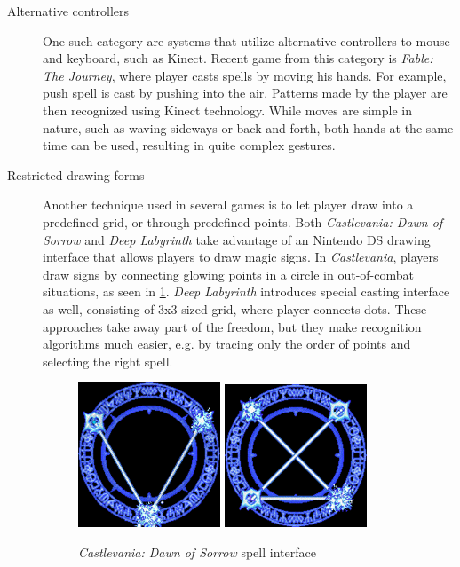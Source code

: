 \begin{description}
\item[Alternative controllers]
One such category are systems that utilize alternative controllers to mouse and keyboard, such as Kinect. Recent game from this category is \emph{Fable: The Journey}, where player casts spells by moving his hands. For example, push spell is cast by pushing into the air. Patterns made by the player are then recognized using Kinect technology. While moves are simple in nature, such as waving sideways or back and forth, both hands at the same time can be used, resulting in quite complex gestures.

\item[Restricted drawing forms]
Another technique used in several games is to let player draw into a predefined grid, or through predefined points. Both \emph{Castlevania: Dawn of Sorrow} and \emph{Deep Labyrinth} take advantage of an Nintendo DS drawing interface that allows players to draw magic signs. 
In \emph{Castlevania}, players draw signs by connecting glowing points in a circle in out-of-combat situations, as seen in \cref{fig:castlevania}. \emph{Deep Labyrinth} introduces special casting interface as well, consisting of 3x3 sized grid, where player connects dots. These approaches take away part of the freedom, but they make recognition algorithms much easier, e.g. by tracing only the order of points and selecting the right spell.

\begin{figure}
\centering
\includegraphics[width=.3\linewidth]{ext/castlevania.png}
\quad
\includegraphics[width=.3\linewidth]{ext/castlevania2.png}
\caption{\emph{Castlevania: Dawn of Sorrow} spell interface }
\label{fig:castlevania} %
\end{figure}


\end{description}
